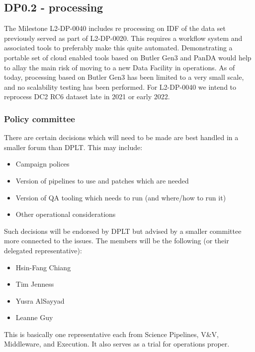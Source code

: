 \subsection{DP0.2 - processing} \label{sec:dp0.2}

The Milestone L2-DP-0040 includes re processing on IDF of the data set previously served as part of L2-DP-0020.
This requires a workflow system and associated tools to preferably make this quite automated.
Demonstrating a portable set of cloud enabled tools based on Butler Gen3 and PanDA would help to allay the main risk of moving to a new Data Facility in operations.
As of today, processing based on Butler Gen3 has been limited to a very small scale, and no scalability testing has been performed. For L2-DP-0040 we intend to reprocess DC2 RC6  dataset late in 2021 or early 2022.


\subsubsection {Policy committee}

There are certain decisions which will need to be made are best handled in a smaller forum than DPLT.
This may include:

\begin{itemize}
\item Campaign polices
\item Version of pipelines to use and patches which are needed
\item Version of QA tooling which needs to run (and where/how to run it)
\item Other operational considerations
\end{itemize}

Such decisions will be endorsed by DPLT but advised by a smaller committee more connected to the issues.
The members will be the following (or their delegated representative):

\begin{itemize}
\item Hsin-Fang Chiang
\item Tim Jenness
\item Yusra AlSayyad
\item Leanne Guy
\end{itemize}

This is basically  one representative each from Science Pipelines, V\&V, Middleware, and Execution.
It also serves as a trial for operations proper.





